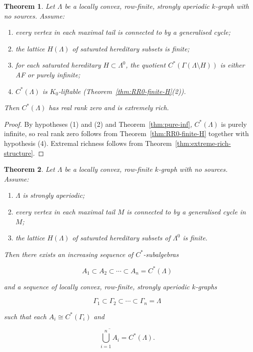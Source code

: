 \documentclass[12pt]{amsart}
\theoremstyle{plain}
\newtheorem{theorem}{Theorem}[section]
\theoremstyle{definition}
\theoremstyle{remark}
\begin{document}
\begin{theorem}\label{thm:RR0-extreme}
Let $\Lambda$ be a locally convex, row-finite, strongly aperiodic $k$-graph with no sources.
Assume:
\begin{enumerate}
\item every vertex in each maximal tail is connected to by a generalised cycle;
\item the lattice $H(\Lambda)$ of saturated hereditary subsets is finite;
\item for each saturated hereditary $H\subset\Lambda^0$, the quotient
      $C^*(\Gamma(\Lambda\setminus H))$ is either AF or purely infinite;
\item $C^*(\Lambda)$ is $K_0$-liftable
      (Theorem~\ref{thm:RR0-finite-H}(2)).
\end{enumerate}
Then $C^*(\Lambda)$ has real rank zero and is extremely rich.
\end{theorem}

\begin{proof}
By hypotheses (1) and (2) and Theorem~\ref{thm:pure-inf}, $C^*(\Lambda)$ is
purely infinite, so real rank zero follows from
Theorem~\ref{thm:RR0-finite-H} together with hypothesis (4). Extremal richness
follows from Theorem~\ref{thm:extreme-rich-structure}.
\end{proof}





\begin{theorem}\label{thm:approx}
Let $\Lambda$ be a locally convex, row-finite $k$-graph with no sources.
Assume:
\begin{enumerate}
\item $\Lambda$ is strongly aperiodic;
\item every vertex in each maximal tail $M$ is connected to by a
      generalised cycle in $M$;
\item the lattice $H(\Lambda)$ of saturated hereditary subsets of
      $\Lambda^0$ is finite.
\end{enumerate}
Then there exists an increasing sequence of $C^*$-subalgebras


\[
A_1 \subset A_2 \subset \cdots \subset A_n = C^*(\Lambda)
\]


and a sequence of locally convex, row-finite, strongly aperiodic
$k$-graphs


\[
\Gamma_1 \subset \Gamma_2 \subset \cdots \subset \Gamma_n = \Lambda
\]


such that each $A_i \cong C^*(\Gamma_i)$ and


\[
\overline{\bigcup_{i=1}^n A_i} = C^*(\Lambda).
\]


\end{theorem}
\end{document}
